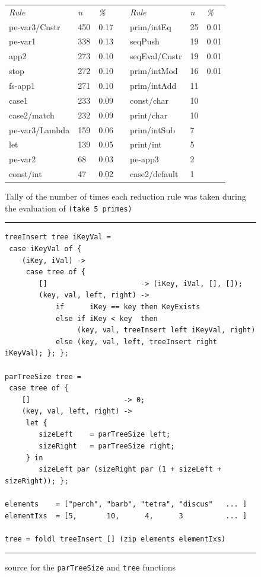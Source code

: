 \documentclass{llncs}
\begin{document}
\begin{figure}
\begin{tabular}{p{3cm}p{1cm}p{1cm}p{1cm}p{3cm}p{1cm}p{1cm}}
\toprule
\emph{Rule} 		& \emph{n}		& \emph{\%} 	& & \emph{Rule}		& \emph{n}	& \emph{\%}	\\
\cmidrule(r){1-3}\cmidrule(l){5-7}
pe-var3/Cnstr		& 450			& 0.17		& & prim/intEq		& 25		& 0.01		\\
pe-var1			& 338			& 0.13		& & seqPush		& 19		& 0.01		\\
app2			& 273			& 0.10		& & seqEval/Cnstr	& 19		& 0.01		\\
stop			& 272			& 0.10		& & prim/intMod		& 16		& 0.01		\\
fs-app1			& 271			& 0.10		& & prim/intAdd		& 11		& 		\\
case1			& 233			& 0.09		& & const/char		& 10		& 		\\
case2/match		& 232			& 0.09		& & print/char		& 10		& 		\\
pe-var3/Lambda		& 159			& 0.06		& & prim/intSub		& 7		& 		\\
let			& 139			& 0.05		& & print/int		& 5		&		\\
pe-var2			& 68			& 0.03		& & pe-app3		& 2		&		\\
const/int		& 47			& 0.02		& & case2/default	& 1		&		\\
\bottomrule
\end{tabular}
\caption{Tally of the number of times each reduction rule was taken during the evaluation of \texttt{(take 5 primes)}}
\label{figPrimesTally}
\end{figure}


\begin{figure}
\hrule
\medskip
\begin{verbatim}
treeInsert tree iKeyVal =
 case iKeyVal of {
    (iKey, iVal) ->
     case tree of {
        []                      -> (iKey, iVal, [], []);
        (key, val, left, right) ->
            if      iKey == key then KeyExists  
            else if iKey < key  then  
                 (key, val, treeInsert left iKeyVal, right)
            else (key, val, left, treeInsert right iKeyVal); }; };

parTreeSize tree =
 case tree of {
    []                      -> 0;
    (key, val, left, right) -> 
     let {
        sizeLeft    = parTreeSize left;
        sizeRight   = parTreeSize right;
     } in 
        sizeLeft par (sizeRight par (1 + sizeLeft + sizeRight)); };

elements    = ["perch", "barb", "tetra", "discus"   ... ]
elementIxs  = [5,       10,      4,      3          ... ]

tree = foldl treeInsert [] (zip elements elementIxs)
\end{verbatim}
\hrule
\caption{\ample source for the \texttt{parTreeSize} and \texttt{tree} functions}
\label{figTreeSource}
\end{figure}
\end{document}
